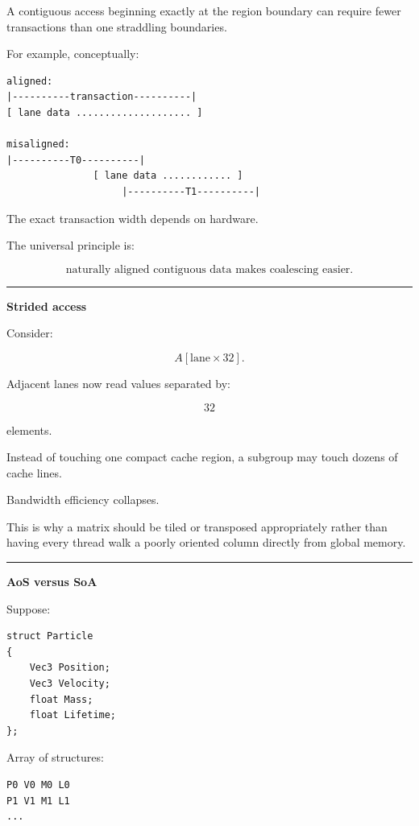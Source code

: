 A contiguous access beginning exactly at the region boundary can require fewer transactions than one straddling boundaries.

For example, conceptually:

\protect{}\label{yfpnbu}%
\begin{verbatim}
aligned:
|----------transaction----------|
[ lane data .................... ]

misaligned:
|----------T0----------|
               [ lane data ............ ]
                    |----------T1----------|
\end{verbatim}

The exact transaction width depends on hardware.

The universal principle is:

\[
\boxed{
\text{naturally aligned contiguous data makes coalescing easier}.
}
\]

\begin{center}\rule{0.5\linewidth}{0.5pt}\end{center}

\textbf{Strided access}

Consider:

\[
A[\text{lane}\times32].
\]

Adjacent lanes now read values separated by:

\[
32
\]

elements.

Instead of touching one compact cache region, a subgroup may touch dozens of cache lines.

Bandwidth efficiency collapses.

This is why a matrix should be tiled or transposed appropriately rather than having every thread walk a poorly oriented column directly from global memory.

\begin{center}\rule{0.5\linewidth}{0.5pt}\end{center}

\textbf{AoS versus SoA}

Suppose:

\protect{}\label{4azajn}%
\begin{verbatim}
struct Particle
{
    Vec3 Position;
    Vec3 Velocity;
    float Mass;
    float Lifetime;
};
\end{verbatim}

Array of structures:

\protect{}\label{9euomv}%
\begin{verbatim}
P0 V0 M0 L0
P1 V1 M1 L1
...
\end{verbatim}

